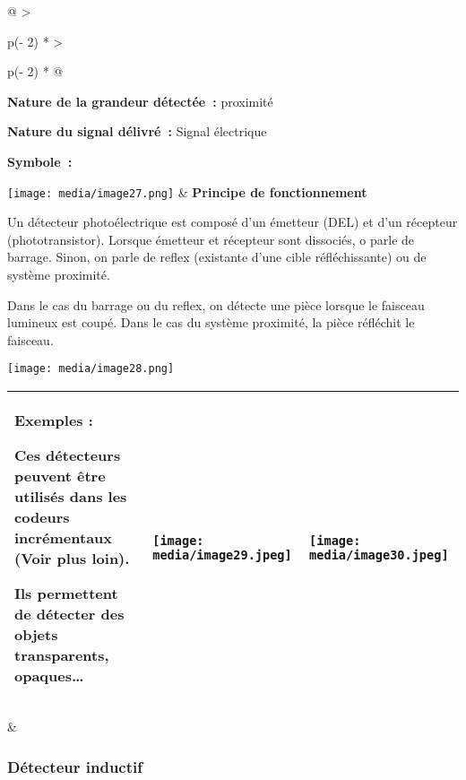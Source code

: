 \documentclass[
]{article}
\begin{document}
\begin{longtable}[]{@{}
  >{\raggedright\arraybackslash}p{(\columnwidth - 2\tabcolsep) * }
  >{\raggedright\arraybackslash}p{(\columnwidth - 2\tabcolsep) * }@{}}
\toprule
\textbf{Nature de la grandeur détectée~:} proximité

\textbf{Nature du signal délivré~:} Signal électrique

\textbf{Symbole~:}

\texttt{[image: media/image27.png]} &
\textbf{Principe de fonctionnement}

Un détecteur photoélectrique est composé d'un émetteur (DEL) et d'un
récepteur (phototransistor). Lorsque émetteur et récepteur sont
dissociés, o parle de barrage. Sinon, on parle de reflex (existante
d'une cible réfléchissante) ou de système proximité.

Dans le cas du barrage ou du reflex, on détecte une pièce lorsque le
faisceau lumineux est coupé. Dans le cas du système proximité, la pièce
réfléchit le faisceau.

\texttt{[image: media/image28.png]} \\
\midrule
\endhead
\begin{minipage}[t]{\linewidth}\raggedright
\begin{longtable}[]{@{}
  >{\raggedright\arraybackslash}p{}
  >{\raggedright\arraybackslash}p{}
  >{\raggedright\arraybackslash}p{}@{}}
\toprule
\endhead
\textbf{Exemples :}

Ces détecteurs peuvent être utilisés dans les codeurs incrémentaux (Voir
plus loin).

Ils permettent de détecter des objets transparents, opaques\ldots{} &
\texttt{[image: media/image29.jpeg]} &
\texttt{[image: media/image30.jpeg]} \\
\bottomrule
\end{longtable}
\end{minipage} & \\
\bottomrule
\end{longtable}

\hypertarget{duxe9tecteur-inductif}{%
\subsubsection{Détecteur inductif}\label{duxe9tecteur-inductif}}
\end{document}
